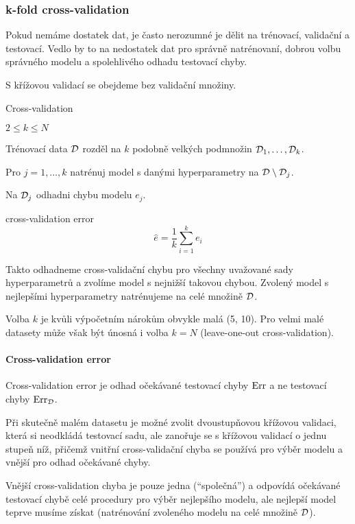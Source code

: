 \documentclass[../main.tex]{subfiles}
\begin{document}
\subsubsection{k-fold cross-validation}

Pokud nemáme dostatek dat, je často nerozumné je dělit na trénovací, validační a testovací. Vedlo by to na nedostatek dat pro správně natrénovaní, dobrou volbu správného modelu a spolehlivého odhadu testovací chyby.

S křížovou validací se obejdeme bez validační množiny.
\begin{algorithm}[H]
    \renewcommand{\thealgorithm}{}
    \caption{Cross-validation}
    \begin{algorithmic}[1]
        \Require $2 \le k \le N$
        \item Trénovací data $\mathcal{D}$ rozděl na $k$ podobně velkých podmnožin $\mathcal{D}_1, \ldots, \mathcal{D}_k$.
        \item Pro $j = 1, \ldots, k$ natrénuj model s danými hyperparametry na $\mathcal{D} \setminus \mathcal{D}_j$.
        \item Na $\mathcal{D}_j$ odhadni chybu modelu $e_j$.
        \item \Return cross-validation error
        \[\hat{e} = \frac{1}{k} \sum_{i=1}^{k} e_i\]
    \end{algorithmic}
\end{algorithm}

Takto odhadneme cross-validační chybu pro všechny uvažované sady hyperparametrů a zvolíme model s nejnižší takovou chybou. Zvolený model s nejlepšími hyperparametry natrénujeme na celé množině $\mathcal{D}$.

Volba $k$ je kvůli výpočetním nárokům obvykle malá (5, 10). Pro velmi malé datasety může však být únosná i volba $k=N$ (leave-one-out cross-validation).

\paragraph{Cross-validation error} Cross-validation error je odhad očekávané testovací chyby $\text{Err}$ a ne testovací chyby $\text{Err}_{\mathcal{D}}$.

Při skutečně malém datasetu je možné zvolit dvoustupňovou křížovou validaci, která si neodkládá testovací sadu, ale zanořuje se s křížovou validací o jednu stupeň níž, přičemž vnitřní cross-validační chyba se používá pro výběr modelu a vnější pro odhad očekávané chyby.

Vnější cross-validation chyba je pouze jedna (``společná'') a odpovídá očekávané testovací chybě celé procedury pro výběr nejlepšího
modelu, ale nejlepší model teprve musíme získat (natrénování zvoleného modelu na celé množině $\mathcal{D}$).
\end{document}
